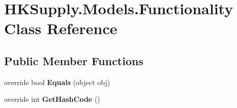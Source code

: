 \hypertarget{class_h_k_supply_1_1_models_1_1_functionality}{}\section{H\+K\+Supply.\+Models.\+Functionality Class Reference}
\label{class_h_k_supply_1_1_models_1_1_functionality}
\subsection*{Public Member Functions}
\begin{DoxyCompactItemize}
\item 
\mbox{\label{class_h_k_supply_1_1_models_1_1_functionality_a335165c2bd6cbc5ff6d314cb03d70246}} 
override bool {\bfseries Equals} (object obj)
\item 
\mbox{\label{class_h_k_supply_1_1_models_1_1_functionality_ad460dce69ed01477901c5ac1e2abcd89}} 
override int {\bfseries Get\+Hash\+Code} ()
\end{DoxyCompactItemize}
